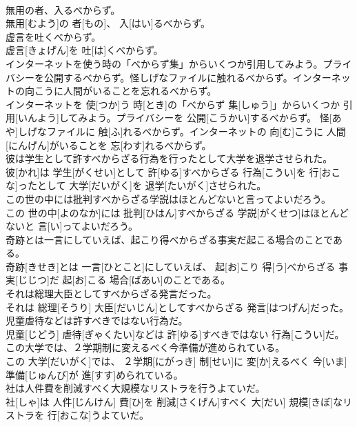 \documentclass[8pt]{extreport}
\begin{document}
\begin{CJK}{UTF8}{min}
\\	無用の者、入るべからず。	
\\	無用[むよう]の 者[もの]、 入[はい]るべからず。
\\	虚言を吐くべからず。	
\\	虚言[きょげん]を 吐[は]くべからず。
\\	インターネットを使う時の「べからず集」からいくつか引用してみよう。プライバシーを公開するべからず。怪しげなファイルに触れるべからず。インターネットの向こうに人間がいることを忘れるべからず。	
\\	インターネットを 使[つか]う 時[とき]の「べからず 集[しゅう]」からいくつか 引用[いんよう]してみよう。プライバシーを 公開[こうかい]するべからず。 怪[あや]しげなファイルに 触[ふ]れるべからず。インターネットの 向[む]こうに 人間[にんげん]がいることを 忘[わす]れるべからず。
\\	彼は学生として許すべからざる行為を行ったとして大学を退学させられた。	
\\	彼[かれ]は 学生[がくせい]として 許[ゆる]すべからざる 行為[こうい]を 行[おこな]ったとして 大学[だいがく]を 退学[たいがく]させられた。
\\	この世の中には批判すべからざる学説はほとんどないと言ってよいだろう。	
\\	この 世の中[よのなか]には 批判[ひはん]すべからざる 学説[がくせつ]はほとんどないと 言[い]ってよいだろう。
\\	奇跡とは一言にしていえば、起こり得べからざる事実だ起こる場合のことである。	
\\	奇跡[きせき]とは 一言[ひとこと]にしていえば、 起[お]こり 得[う]べからざる 事実[じじつ]だ 起[お]こる 場合[ばあい]のことである。
\\	それは総理大臣としてすべからざる発言だった。	
\\	それは 総理[そうり] 大臣[だいじん]としてすべからざる 発言[はつげん]だった。
\\	児童虐待などは許すべきではない行為だ。	
\\	児童[じどう] 虐待[ぎゃくたい]などは 許[ゆる]すべきではない 行為[こうい]だ。
\\	この大学では、２学期制に変えるべく今準備が進められている。	
\\	この 大学[だいがく]では、 ２学期[にがっき] 制[せい]に 変[か]えるべく 今[いま] 準備[じゅんび]が 進[すす]められている。
\\	社は人件費を削減すべく大規模なリストラを行うよていだ。	
\\	社[しゃ]は 人件[じんけん] 費[ひ]を 削減[さくげん]すべく 大[だい] 規模[きぼ]なリストラを 行[おこな]うよていだ。

\end{CJK}
\end{document}
